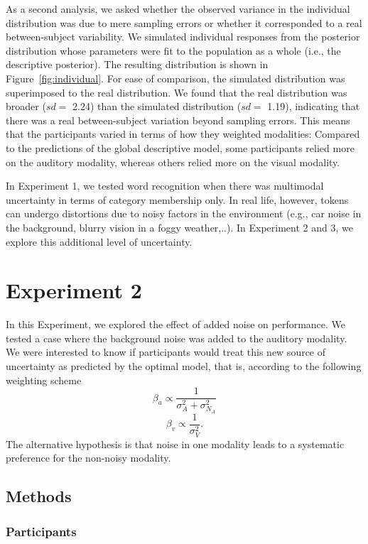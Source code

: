 \documentclass[english,floatsintext,man]{apa6}
\theoremstyle{definition}
\theoremstyle{definition}
\theoremstyle{definition}
\theoremstyle{remark}
\begin{document}
As a second analysis, we asked whether the observed variance in the
individual distribution was due to mere sampling errors or whether it
corresponded to a real between-subject variability. We simulated
individual responses from the posterior distribution whose parameters
were fit to the population as a whole (i.e., the descriptive posterior).
The resulting distribution is shown in Figure~\ref{fig:individual}. For
ease of comparison, the simulated distribution was superimposed to the
real distribution. We found that the real distribution was broader
(\(sd=\) 2.24) than the simulated distribution (\(sd=\) 1.19),
indicating that there was a real between-subject variation beyond
sampling errors. This means that the participants varied in terms of how
they weighted modalities: Compared to the predictions of the global
descriptive model, some participants relied more on the auditory
modality, whereas others relied more on the visual modality.

In Experiment 1, we tested word recognition when there was multimodal
uncertainty in terms of category membership only. In real life, however,
tokens can undergo distortions due to noisy factors in the environment
(e.g., car noise in the background, blurry vision in a foggy
weather,..). In Experiment 2 and 3, we explore this additional level of
uncertainty.

\section{Experiment 2}\label{experiment-2}

In this Experiment, we explored the effect of added noise on
performance. We tested a case where the background noise was added to
the auditory modality. We were interested to know if participants would
treat this new source of uncertainty as predicted by the optimal model,
that is, according to the following weighting scheme
\[\beta_a \propto \frac{1}{\sigma^2_{A}+\sigma^2_{N_A}}\]
\[\beta_v \propto \frac{1}{\sigma^2_{V}}.\] The alternative hypothesis
is that noise in one modality leads to a systematic preference for the
non-noisy modality.

\subsection{Methods}\label{methods-1}

\subsubsection{Participants}\label{participants-1}
\end{document}
